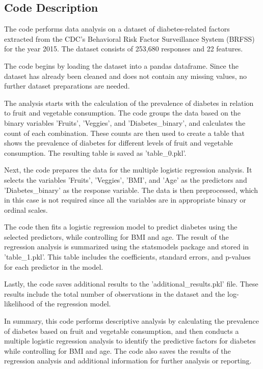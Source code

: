 \documentclass[11pt]{article}
\begin{document}
\subsection{Code Description}

The code performs data analysis on a dataset of diabetes-related factors extracted from the CDC's Behavioral Risk Factor Surveillance System (BRFSS) for the year 2015. The dataset consists of 253,680 responses and 22 features.

The code begins by loading the dataset into a pandas dataframe. Since the dataset has already been cleaned and does not contain any missing values, no further dataset preparations are needed.

The analysis starts with the calculation of the prevalence of diabetes in relation to fruit and vegetable consumption. The code groups the data based on the binary variables 'Fruits', 'Veggies', and 'Diabetes\_binary', and calculates the count of each combination. These counts are then used to create a table that shows the prevalence of diabetes for different levels of fruit and vegetable consumption. The resulting table is saved as 'table\_0.pkl'.

Next, the code prepares the data for the multiple logistic regression analysis. It selects the variables 'Fruits', 'Veggies', 'BMI', and 'Age' as the predictors and 'Diabetes\_binary' as the response variable. The data is then preprocessed, which in this case is not required since all the variables are in appropriate binary or ordinal scales.

The code then fits a logistic regression model to predict diabetes using the selected predictors, while controlling for BMI and age. The result of the regression analysis is summarized using the statsmodels package and stored in 'table\_1.pkl'. This table includes the coefficients, standard errors, and p-values for each predictor in the model.

Lastly, the code saves additional results to the 'additional\_results.pkl' file. These results include the total number of observations in the dataset and the log-likelihood of the regression model.

In summary, this code performs descriptive analysis by calculating the prevalence of diabetes based on fruit and vegetable consumption, and then conducts a multiple logistic regression analysis to identify the predictive factors for diabetes while controlling for BMI and age. The code also saves the results of the regression analysis and additional information for further analysis or reporting.
\end{document}
